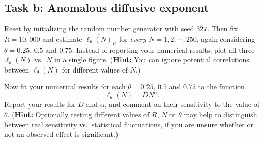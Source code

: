 \documentclass[12 pt]{article} %
\newcommand{\al}{\ensuremath{\alpha} }
\newcommand{\showmarks}[1]{\rightline{\texttt{[#1 marks]}}} %
\begin{document}
\showmarks{12}

\subsection*{Task b: Anomalous diffusive exponent}
Reset by initializing the random number generator with seed $327$.
Then fix $R = 10{,}000$ and estimate $\overline{\ell_{\theta}(N)}_R$ for \textit{every} $N = 1, 2, \cdots, 250$, again considering $\theta = 0.25$, $0.5$ and $0.75$.
Instead of reporting your numerical results, plot all three $\ell_{\theta}(N)$ vs.\ $N$ in a single figure.
(\textbf{Hint:} You can ignore potential correlations between $\ell_{\theta}(N)$ for different values of $N$.)

\showmarks{8}

Now fit your numerical results for each $\theta = 0.25$, $0.5$ and $0.75$ to the function
\begin{equation*}
  \ell_{\theta}(N) = D N^{\al}.
\end{equation*}
Report your results for $D$ and $\al$, and comment on their sensitivity to the value of $\theta$.
(\textbf{Hint:} Optionally testing different values of $R$, $N$ or $\theta$ may help to distinguish between real sensitivity vs.\ statistical fluctuations, if you are unsure whether or not an observed effect is significant.)

\showmarks{10}



\end{document}
